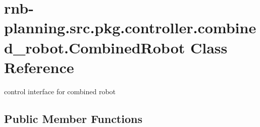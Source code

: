 \hypertarget{classrnb-planning_1_1src_1_1pkg_1_1controller_1_1combined__robot_1_1_combined_robot}{}\section{rnb-\/planning.src.\+pkg.\+controller.\+combined\+\_\+robot.\+Combined\+Robot Class Reference}
\label{classrnb-planning_1_1src_1_1pkg_1_1controller_1_1combined__robot_1_1_combined_robot}


control interface for combined robot  


\subsection*{Public Member Functions}
